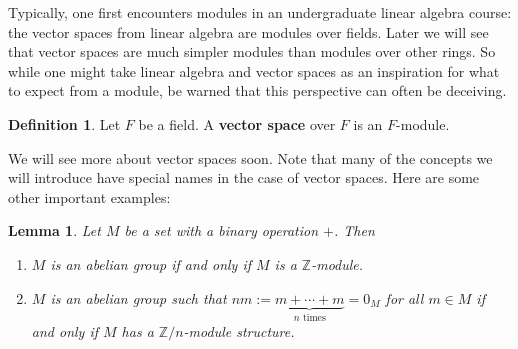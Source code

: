 \documentclass[12pt]{report}
\newtheorem{lemma}[theorem]{Lemma}
\numberwithin{equation}{section}
\numberwithin{theorem}{chapter}
\theoremstyle{definition}
\newtheorem{definition}[theorem]{Definition}
\newtheorem*{basic properties}{Basic Properties}
\newtheorem*{Important Remark}{Important Remark}
\newcommand{\df}[1]{{\bf #1}\index{#1}}
\begin{document}
Typically, one first encounters modules in an undergraduate linear algebra course: the vector spaces from linear algebra are modules over fields. Later we will see that vector spaces are much simpler modules than modules over other rings. So while one might take linear algebra and vector spaces as an inspiration for what to expect from a module, be warned that this perspective can often be deceiving.

\begin{definition}
	Let $F$ be a field. A \df{vector space} over $F$ is an $F$-module.
\end{definition}

We will see more about vector spaces soon. Note that many of the concepts we will introduce have special names in the case of vector spaces. Here are some other important examples:



\begin{lemma}\label{Zmods are abelian groups}
 Let $M$ be a set with a binary operation $+$. Then 
 \begin{enumerate}[label=(\arabic*)]
 \item $M$ is an abelian group if and only if $M$ is a $\mathbb{Z}$-module.
 \item $M$ is an abelian group such that $nm:=\underbrace{ m + \cdots + m}_{n \textrm{ times}}=0_M$ for all $m\in M$ if and only if $M$ has a $\mathbb{Z}/n$-module structure.
 \end{enumerate}
\end{lemma}
\end{document}
